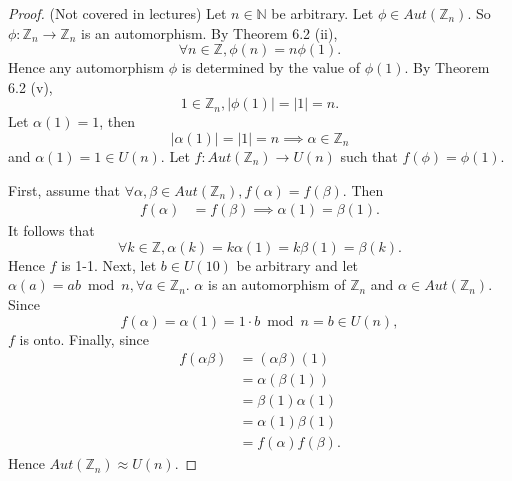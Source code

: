 \documentclass{article}
\newtheorem{theorem}{Theorem}[section]
\theoremstyle{definition}
\begin{document}
 \noindent{}
 
 \begin{proof}
     (Not covered in lectures) Let $n \in \mathbb{N}$ be arbitrary. Let $\phi \in Aut(\mathbb{Z}_n)$. So $\phi: \mathbb{Z}_n \to \mathbb{Z}_n$ is an automorphism. By Theorem 6.2 (ii),
     \begin{equation*}
        \forall n \in \mathbb{Z}, \phi(n) = n\phi(1).
     \end{equation*}
     Hence any automorphism $\phi$ is determined by the value of $\phi(1)$. By Theorem 6.2 (v),
     \begin{equation*}
         1 \in \mathbb{Z}_n, |\phi(1)| = |1| = n.
     \end{equation*}
     Let $\alpha(1) = 1$, then 
     \begin{equation*}
         |\alpha(1)| = |1| = n \implies \alpha \in \mathbb{Z}_n
     \end{equation*}
     and $\alpha(1) = 1 \in U(n)$. Let $f: Aut(\mathbb{Z}_n) \to U(n)$ such that $f(\phi) = \phi(1)$. 
     
     First, assume that $\forall \alpha, \beta \in Aut(\mathbb{Z}_n), f(\alpha) = f(\beta)$. Then
     \begin{align*}
         f(\alpha) &= f(\beta) \implies \alpha(1) = \beta(1).
     \end{align*}
     It follows that 
     \begin{equation*}
         \forall k \in \mathbb{Z}, \alpha(k) = k\alpha(1) = k\beta(1) = \beta(k).
     \end{equation*}
     Hence $f$ is 1-1. Next, let $b \in U(10)$ be arbitrary and let $\alpha(a) = ab \bmod n, \forall a \in \mathbb{Z}_n$. $\alpha$ is an automorphism of $\mathbb{Z}_n$ and $\alpha \in Aut(\mathbb{Z}_n)$. Since
     \begin{equation*}
         f(\alpha) = \alpha(1) = 1\cdot b \bmod n = b \in U(n),
     \end{equation*}
     $f$ is onto. Finally, since
     \begin{align*}
         f(\alpha\beta) &= (\alpha\beta)(1) \\
         &= \alpha(\beta(1)) \\
         &= \beta(1)\alpha(1) \\
         &= \alpha(1)\beta(1) \\
         &= f(\alpha)f(\beta).
     \end{align*}
     Hence $Aut(\mathbb{Z}_n) \approx U(n)$. 
 \end{proof}
 
\end{document}
